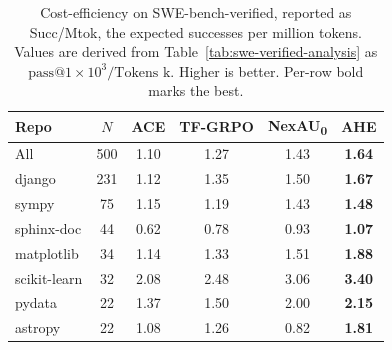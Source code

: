 \begin{table}[t]
    \centering
    \small
    \setlength{\tabcolsep}{6pt}
    \renewcommand{\arraystretch}{1.05}
    \caption{Cost-efficiency on SWE-bench-verified, reported as Succ/Mtok, the expected successes per million tokens. Values are derived from Table~\ref{tab:swe-verified-analysis} as $\mathrm{pass@1} \times 10^{3} / \text{Tokens k}$. Higher is better. Per-row bold marks the best.}
    \label{tab:swe-verified-succ-mtok}
    \begin{tabular}{lccccc}
        \toprule
        Repo & $N$ & ACE & TF-GRPO & NexAU\textsubscript{0} & \textbf{AHE} \\
        \midrule
        All            & 500 & 1.10 & 1.27 & 1.43 & \textbf{1.64} \\
        \midrule
        django         & 231 & 1.12 & 1.35 & 1.50 & \textbf{1.67} \\
        sympy          &  75 & 1.15 & 1.19 & 1.43 & \textbf{1.48} \\
        sphinx-doc     &  44 & 0.62 & 0.78 & 0.93 & \textbf{1.07} \\
        matplotlib     &  34 & 1.14 & 1.33 & 1.51 & \textbf{1.88} \\
        scikit-learn   &  32 & 2.08 & 2.48 & 3.06 & \textbf{3.40} \\
        pydata         &  22 & 1.37 & 1.50 & 2.00 & \textbf{2.15} \\
        astropy        &  22 & 1.08 & 1.26 & 0.82 & \textbf{1.81} \\
        \bottomrule
    \end{tabular}
\end{table}
